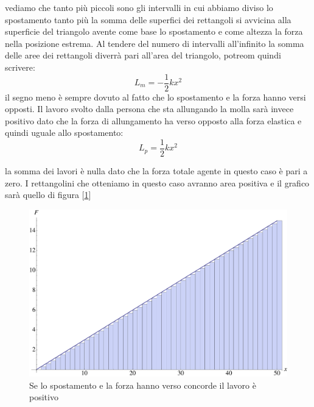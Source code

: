 \documentclass[a4paper,10pt,oneside]{article}
\begin{document}
vediamo che tanto più piccoli sono gli intervalli in cui abbiamo diviso lo spostamento tanto più la somma delle superfici dei rettangoli si avvicina alla superficie del triangolo avente come base lo spostamento e come altezza la forza nella posizione estrema. Al tendere del numero di intervalli all'infinito la somma delle aree  dei rettangoli diverrà pari all'area del triangolo, potreom quindi scrivere:
\begin{equation}
 L_m=-\frac 1 2 kx^2
\end{equation}
il segno meno è sempre dovuto al fatto che lo spostamento e la forza hanno versi opposti. Il lavoro svolto dalla persona che sta allungando la molla sarà invece positivo dato che la forza di allungamento ha verso opposto alla forza elastica e quindi uguale allo spostamento:
\begin{equation}
L_p=\frac 1 2 kx^2
\end{equation}

la somma dei lavori è nulla dato che la forza totale agente in questo caso è pari a zero. I rettangolini che otteniamo in questo caso avranno area positiva e il grafico sarà quello di figura [\ref{fig:lavoro_molla_approssimazione}]

\begin{figure}[H]

 \centering
 \includegraphics[width=\textwidth]{./immagini/lavoro_molla.pdf}
\caption{Se lo spostamento e la forza hanno verso concorde il lavoro è positivo}\label{fig:lavoro_molla_approssimazione}
\end{figure}
\end{document}
